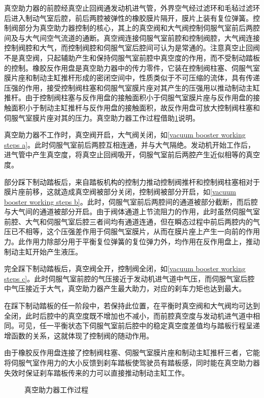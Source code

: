 \documentclass[UTF8]{ctexart}
\numberwithin{figure}{section}
\numberwithin{table}{section}
\begin{document}
真空助力器的前腔经真空止回阀通发动机进气管，外界空气经过滤环和毛毡过滤环后进入制动气室后腔，前后两腔被弹性的橡胶膜片隔开，膜片上装有复位弹簧。控制阀部分为真空助力器控制的核心，其上的真空阀和大气阀控制伺服气室前后两腔间及与大气间空气流道的通断。真空阀连接伺服气室前腔和控制阀腔，大气阀连接控制阀腔和大气，而控制阀腔和伺服气室后腔间可认为是常通的。注意真空止回阀不是真空阀，只起辅助产生和保持伺服气室前腔中真空度的作用，而不受制动踏板的控制。橡胶反作用盘是真空助力器中的传力零件，它装在控制阀柱塞、伺服气室膜片座和制动主缸推杆形成的密闭空间中，性质类似于不可压缩的流体，具有传递压强的作用，接受控制阀柱塞和伺服气室膜片座对其产生的压强用以推动制动主缸推杆。由于控制阀柱塞与反作用盘的接触面积小于伺服气室膜片座与反作用盘的接触面积小于制动主缸推杆与反作用盘的接触面积，故反作用盘可放大控制阀柱塞和伺服气室膜片座对其的压力。真空助力器工作过程借助\cref{vacuum booster working steps}说明。

真空助力器不工作时，真空阀开启，大气阀关闭，如\cref{vacuum booster working steps a}。此时伺服气室前后两腔互相连通，并与大气隔绝。发动机开始工作后，进气管中产生真空度，将真空止回阀吸开，伺服气室前后两腔产生近似相等的真空度。

部分踩下制动踏板后，来自踏板机构的控制力推动控制阀推杆和控制阀柱塞相对于膜片座前移，这就造成真空阀被部分关闭，控制阀被部分开启，如\cref{vacuum booster working steps b}。此时，伺服气室前后两腔间的通道被部分截断，而后腔与大气间的通道被部分开启。由于阀体通道上节流阻力的作用，此时虽然伺服气室前腔、大气和伺服气室后腔三者间均有通道连通，但在瞬态过程中前后两腔内的气压已不相等，这个压强差作用于伺服气室膜片，从而在膜片座上产生一向前的作用力。此作用力除部分用于平衡复位弹簧的复位弹力外，均作用在反作用盘上，推动制动主缸开始产生液压。

完全踩下制动踏板后，真空阀全开，控制阀全闭，如\cref{vacuum booster working steps c}。此时伺服气室前腔的气压接近于发动机进气道中气压，而伺服气室后腔中气压接近于大气，真空助力器产生最大助力，对应的刹车力矩也达到最大。

在踩下制动踏板的任一阶段中，若保持此位置，在平衡时真空阀和大气阀均可达到全闭，此时后腔中的真空度既不增加也不减小，而前腔真空度与发动机进气道中相同。可见，任一平衡状态下伺服气室前后腔中的稳定真空度差值均与踏板行程呈递增函数的关系，这就体现了控制阀的随动作用。

由于橡胶反作用盘连接了控制阀柱塞、伺服气室膜片座和制动主缸推杆三者，它能将伺服气室作用力的大小反馈到刹车踏板使驾驶员有踏板感，同时能在真空助力器失效时保证刹车踏板传来的力可以直接推动制动主缸工作。

\begin{figure}[htbp]
	\centering
	\begin{minipage}[b]{\textwidth}
		\centering
		\caption{真空助力器工作过程}
		\label{vacuum booster working steps}
	\end{minipage}
\end{figure}
\end{document}
